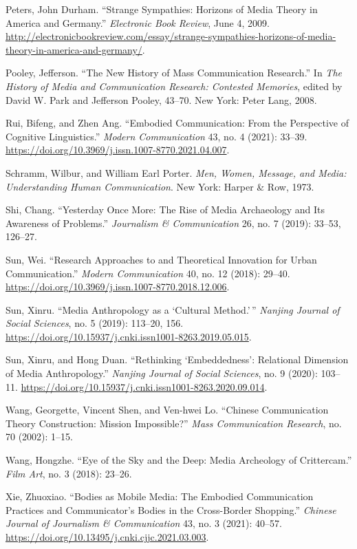 \documentclass{tufte-handout}
\begin{document}
\begin{hangparas}{.25in}{1}
Peters, John Durham. ``Strange Sympathies: Horizons of Media Theory in
America and Germany.'' \emph{Electronic Book Review}, June 4, 2009.
\href{http://electronicbookreview.com/essay/strange-sympathies-horizons-of-media-theory-in-america-and-germany/}{http://electronicbookreview.com/essay/strange-sympathies-horizons-of-media-theory-in-america-and-germany/}.

Pooley, Jefferson. ``The New History of Mass Communication Research.''
In \emph{The History of Media and Communication Research: Contested
Memories}, edited by David W. Park and Jefferson Pooley, 43--70. New
York: Peter Lang, 2008.

Rui, Bifeng, and Zhen Ang. ``Embodied Communication: From the
Perspective of Cognitive Linguistics.'' \emph{Modern Communication} 43,
no. 4 (2021): 33--39.
\url{https://doi.org/10.3969/j.issn.1007-8770.2021.04.007}.

Schramm, Wilbur, and William Earl Porter. \emph{Men, Women, Message, and
Media: Understanding Human Communication}. New York: Harper \& Row,
1973.

Shi, Chang. ``Yesterday Once More: The Rise of Media Archaeology and Its
Awareness of Problems.'' \emph{Journalism \& Communication} 26, no. 7
(2019): 33--53, 126--27.

Sun, Wei. ``Research Approaches to and Theoretical Innovation for Urban
Communication.'' \emph{Modern Communication} 40, no. 12 (2018): 29--40.
\url{https://doi.org/10.3969/j.issn.1007-8770.2018.12.006}.

Sun, Xinru. ``Media Anthropology as a `Cultural Method.'\,''
\emph{Nanjing Journal of Social Sciences}, no. 5 (2019): 113--20, 156.
\url{https://doi.org/10.15937/j.cnki.issn1001-8263.2019.05.015}.

Sun, Xinru, and Hong Duan. ``Rethinking `Embeddedness': Relational
Dimension of Media Anthropology.'' \emph{Nanjing Journal of Social
Sciences}, no. 9 (2020): 103--11.
\url{https://doi.org/10.15937/j.cnki.issn1001-8263.2020.09.014}.

Wang, Georgette, Vincent Shen, and Ven-hwei Lo. ``Chinese Communication
Theory Construction: Mission Impossible?'' \emph{Mass Communication
Research}, no. 70 (2002): 1--15.

Wang, Hongzhe. ``Eye of the Sky and the Deep: Media Archeology of
Crittercam.'' \emph{Film Art}, no. 3 (2018): 23--26.

Xie, Zhuoxiao. ``Bodies as Mobile Media: The Embodied Communication
Practices and Communicator's Bodies in the Cross-Border Shopping.''
\emph{Chinese Journal of Journalism \& Communication} 43, no. 3 (2021):
40--57. \url{https://doi.org/10.13495/j.cnki.cjjc.2021.03.003}.


\end{hangparas}
\end{document}
